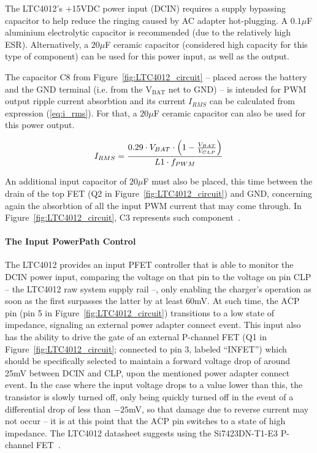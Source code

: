 The LTC4012's +15VDC power input (DCIN) requires a supply bypassing capacitor to help reduce the \gls{ringing} caused by AC adapter \gls{hot-plugging}. A $0.1 \mu$F aluminium electrolytic capacitor is recommended (due to the relatively high \gls{ESR}). Alternatively, a $20 \mu$F ceramic capacitor (considered high capacity for this type of component) can be used for this power input, as well as the output.

The capacitor C8 from Figure~\ref{fig:LTC4012_circuit} -- placed across the battery and the GND terminal (i.e. from the $\mathrm{V_{BAT}}$ net to GND) -- is intended for PWM output ripple current absorbtion and its current $I_{RMS}$ can be calculated from expression (\ref{eq:i_rms}). For that, a $20 \mu$F ceramic capacitor can also be used for this power output.

\begin{equation}\label{eq:i_rms}
    I_{RMS}=\frac{0.29 \cdot V_{BAT} \cdot \left(1- \frac{V_{BAT}}{V_{CLP}}\right)}{L1 \cdot f_{PWM}}\,\medskip
\end{equation}

An additional input capacitor of $20 \mu$F must also be placed, this time between the drain of the top FET (Q2 in Figure~\ref{fig:LTC4012_circuit}) and GND, concerning again the absorbtion of all the input PWM current that may come through. In Figure~\ref{fig:LTC4012_circuit}, C3 represents such component~\cite{LTC4012}.

\paragraph{The Input PowerPath Control}	The LTC4012 provides an input PFET controller that is able to monitor the DCIN power input, comparing the voltage on that pin to the voltage on pin CLP -- the LTC4012 raw system supply rail --, only enabling the charger's operation as soon as the first surpasses the latter by at least 60mV. At such time, the $\overline{\mbox{ACP}}$ pin (pin 5 in Figure~\ref{fig:LTC4012_circuit}) transitions to a low state of impedance, signaling an external power adapter connect event. This input also has the ability to drive the gate of an external P-channel FET (Q1 in Figure~\ref{fig:LTC4012_circuit}; connected to pin 3, labeled ``INFET'') which should be specifically selected to maintain a forward voltage drop of around 25mV between DCIN and CLP, upon the mentioned power adapter connect event. In the case where the input voltage drops to a value lower than this, the transistor is slowly turned off, only being quickly turned off in the event of a differential drop of less than $-25$mV, so that damage due to reverse current may not occur -- it is at this point that the $\overline{\mbox{ACP}}$ pin switches to a state of high impedance. The LTC4012 datasheet suggests using the Si7423DN-T1-E3 P-channel FET~\cite{LTC4012}.

